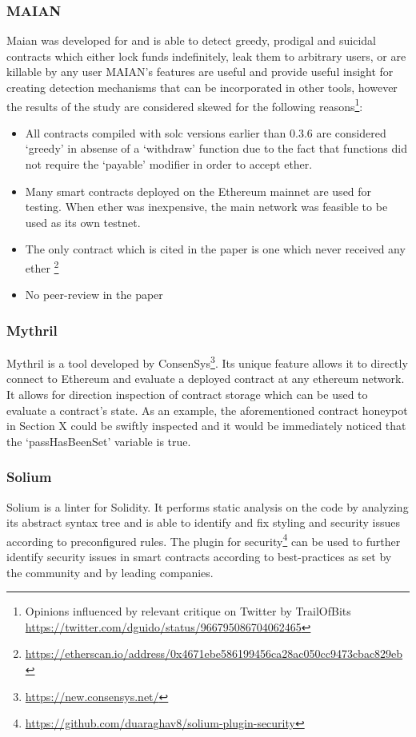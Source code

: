 \subsubsection{MAIAN}
Maian \cite{maian} was developed for \cite{greedyprodigal} and is able to detect greedy, prodigal and suicidal contracts which either lock funds indefinitely, leak them to arbitrary users, or are killable by any user %
MAIAN's features are useful and provide useful insight for creating detection mechanisms that can be incorporated in other tools, however the results of the study are considered skewed for the following reasons\footnote{Opinions influenced by relevant critique on Twitter by TrailOfBits \url{https://twitter.com/dguido/status/966795086704062465}}:
\begin{itemize}
    \item All contracts compiled with solc versions earlier than 0.3.6 are considered `greedy' in absense of a `withdraw' function due to the fact that functions did not require the `payable' modifier in order to accept ether. 
    \item Many smart contracts deployed on the Ethereum mainnet are used for testing. When ether was inexpensive, the main network was feasible to be used as its own testnet.
    \item The only contract which is cited in the paper is one which never  received any ether \footnote{\url{https://etherscan.io/address/0x4671ebe586199456ca28ac050cc9473cbac829eb}}
    \item No peer-review in the paper
\end{itemize}

\subsubsection{Mythril}
Mythril \cite{mythril} is a tool developed by ConsenSys\footnote{\url{https://new.consensys.net/}}. Its unique feature allows it to directly connect to Ethereum and evaluate a deployed contract at any ethereum network. It allows for direction inspection of contract storage which can be used to evaluate a contract's state. As an example, the aforementioned contract honeypot in Section X could be swiftly inspected and it would be immediately noticed that the `passHasBeenSet' variable is true.


\subsubsection{Solium}
Solium \cite{solium} is a linter for Solidity. It performs static analysis on the code by analyzing its abstract syntax tree and is able to identify and fix styling and security issues according to preconfigured rules. The plugin for security\footnote{\url{https://github.com/duaraghav8/solium-plugin-security}} can be used to further identify security issues in smart contracts according to best-practices as set by the community and by leading companies.

